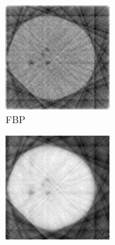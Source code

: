 \documentclass[journal]{IEEEtran}
\begin{document}
\begin{figure}[!h]
    \begin{subfigure}[b]{0.24\linewidth}
        \includegraphics[width=\textwidth]{../images/potato/2D/fbp.png}
        \caption{FBP}
    \end{subfigure}
    \begin{subfigure}[b]{0.24\linewidth}
        \includegraphics[width=\textwidth]{../images/potato/2D/cs_dct.png}

\end{subfigure}
\end{figure}
\end{document}
